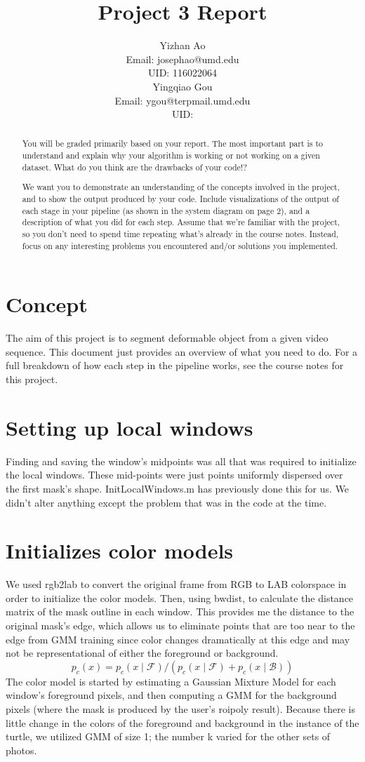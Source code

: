 \documentclass[15pt]{article}
\title{Project 3 Report}
\author{%
  Yizhan Ao\\
  Email: josephao@umd.edu   \\
  UID: 116022064\\
  \And
  Yingqiao Gou\\
  Email: ygou@terpmail.umd.edu\\
  UID: \\
}
\begin{document}
 
\maketitle

\begin{abstract}
You will be graded primarily based on your report.
The most important part is to understand and explain why your algorithm is working or not working on a given dataset. What do you think are the drawbacks of your code!?

We want you to demonstrate an understanding of the concepts involved in the project, and to show the output produced by your code.
Include visualizations of the output of each stage in your pipeline (as shown in the system diagram on page 2), and a description of what you did for each step. Assume that we’re familiar with the project, so you don’t need to spend time repeating what’s already in the course notes. Instead, focus on any interesting problems you encountered and/or solutions you implemented.
\end{abstract}

\section{Concept}
The aim of this project is to segment deformable object from a given video sequence. This document just provides an overview of what you need to do. For a full breakdown of how each step in the pipeline works, see the course notes for this project.

\section{Setting up local windows}
Finding and saving the window's midpoints was all that was required to initialize the local windows. These mid-points were just points uniformly dispersed over the first mask's shape. InitLocalWindows.m has previously done this for us. We didn't alter anything except the problem that was in the code at the time.
\section{Initializes color models}
We used rgb2lab to convert the original frame from RGB to LAB colorspace in order to initialize the color models. Then, using bwdist, to calculate the distance matrix of the mask outline in each window. This provides me the distance to the original mask's edge, which allows us to eliminate points that are too near to the edge from GMM training since color changes dramatically at this edge and may not be representational of either the foreground or background.
\begin{equation}
p_{c}(x)=p_{c}(x \mid \mathcal{F}) /\left(p_{c}(x \mid \mathcal{F})+p_{c}(x \mid \mathcal{B})\right)
\end{equation}
The color model is started by estimating a Gaussian Mixture Model for each window's foreground pixels, and then computing a GMM for the background pixels (where the mask is produced by the user's roipoly result). Because there is little change in the colors of the foreground and background in the instance of the turtle, we utilized GMM of size 1; the number k varied for the other sets of photos.
\end{document}
